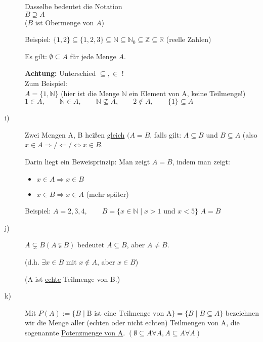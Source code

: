 \documentclass[a4paper, 12pt, twoside] {article}
\begin{document}
\begin{description}
	Dasselbe bedeutet die Notation\\
	$B \supseteq A$ \\
	($B$ ist Obermenge von $A$)
	
	Beispiel: $\{1,2\} \subseteq \{1,2,3\} \subseteq \mathbb{N} \subseteq \mathbb{N}_0 \subseteq \mathbb{Z} \subseteq \mathbb{R}$ (reelle Zahlen)
	
	Es gilt: $\emptyset \subseteq A$ für jede Menge $A$.

	\textbf{Achtung: } Unterschied $\subseteq, \in$ !\\
	Zum Beispiel: \\
	$A = \{1, \mathbb{N}\}$ (hier ist die Menge $\mathbb{N}$ ein Element von A, keine Teilmenge!)\\
	$1 \in A, \qquad \mathbb{N} \in A, \qquad \mathbb{N} \nsubseteq A, \qquad 2 \notin A, \qquad \{1\} \subseteq A$


\item[i)]
	Zwei Mengen A, B heißen \underline{gleich} $(A = B$, falls gilt: $A \subseteq B$ und $B \subseteq A$
	(also $x \in A \Rightarrow / \Leftarrow / \Leftrightarrow x \in B$.


	Darin liegt ein Beweisprinzip: Man zeigt $A = B$, indem man zeigt:
	\begin{itemize}
	\item $x \in A \Rightarrow x \in B$
	\item $x \in B \Rightarrow x \in A$ (mehr später)
	\end{itemize}

	Beispiel:
	$A = {2, 3, 4}, \qquad B = \{ x \in \mathbb{N} \mid x > 1$ und $x < 5\}$
	$A = B$

\item[j)]
	$A \subsetneq B (A \subsetneqq B)$ bedeutet $A \subseteq B$, aber $A \neq B$.

	(d.h. $\exists x \in B$ mit $x \notin A$, aber $x \in B$)

	(A ist \underline{echte} Teilmenge von B.)


\item[k)]
	Mit $P(A) := \{ B \mid \text{B ist eine Teilmenge von A}\} = \{B \mid B \subseteq A\}$
	bezeichnen wir die Menge aller (echten oder nicht echten) Teilmengen von A, die sogenannte \underline{Potenzmenge von A}.
	$(\emptyset \subseteq A \forall A, A \subseteq A \forall A)$


\end{description}
\end{document}
